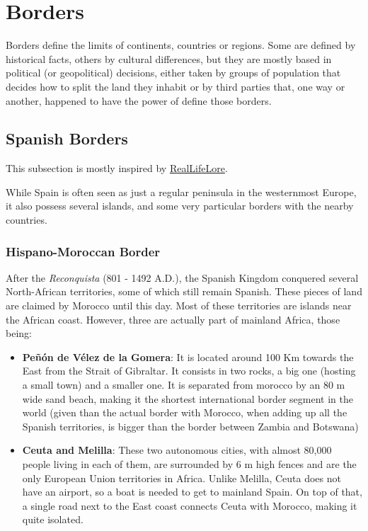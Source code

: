 \documentclass[../my_knowledge.tex]{subfiles}
\begin{document}
\section{Borders}
Borders define the limits of continents, countries or regions. Some are defined by historical facts, others by cultural differences, but they are mostly based in political (or geopolitical) decisions, either taken by groups of population that decides how to split the land they inhabit or by third parties that, one way or another, happened to have the power of define those borders.

\subsection{Spanish Borders}
This subsection is mostly inspired by \href{https://www.youtube.com/watch?v=L6tJ-mvhznU}{RealLifeLore}\cite{spanish_borders}.

While Spain is often seen as just a regular peninsula in the westernmost Europe, it also possess several islands, and some very particular borders with the nearby countries.

\subsubsection{Hispano-Moroccan Border}
After the \textit{Reconquista} (801 - 1492 A.D.), the Spanish Kingdom conquered several North-African territories, some of which still remain Spanish. These pieces of land are claimed by Morocco until this day. Most of these territories are islands near the African coast. However, three are actually part of mainland Africa, those being:

\begin{itemize}
	\item \textbf{Pe\~n\'on de V\'elez de la Gomera}: It is located around 100 Km towards the East from the Strait of Gibraltar. It consists in two rocks, a big one (hosting a small town) and a smaller one. It is separated from morocco by an 80 m wide sand beach, making it the shortest international border segment in the world (given than the actual border with Morocco, when adding up all the Spanish territories, is bigger than the border between Zambia and Botswana\cite{shortest_borders})
	\item \textbf{Ceuta and Melilla}: These two autonomous cities, with almost 80,000 people living in each of them, are surrounded by 6 m high fences and are the only European Union territories in Africa. Unlike Melilla, Ceuta does not have an airport, so a boat is needed to get to mainland Spain. On top of that, a single road next to the East coast connects Ceuta with Morocco, making it quite isolated.
\end{itemize}
\end{document}
